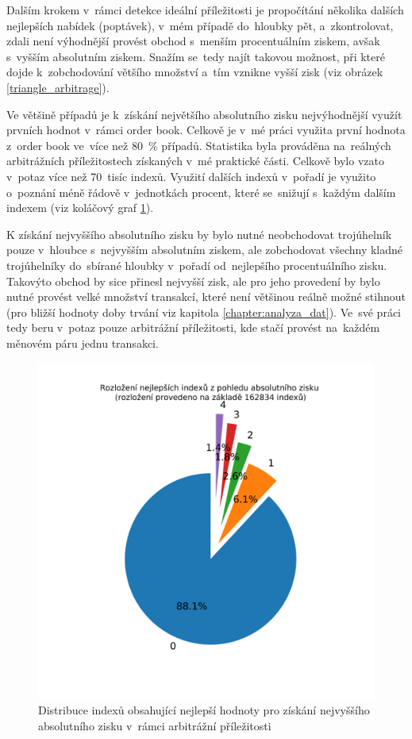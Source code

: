 \documentclass[thesis=B,czech]{FITthesis}[2019/03/21]
\begin{document}
Dalším krokem v~rámci detekce ideální příležitosti je propočítání několika dalších nejlepších nabídek (poptávek), v~mém případě do~hloubky pět, a~zkontrolovat, zdali není výhodnější provést obchod s~menším procentuálním ziskem, avšak s~vyšším absolutním ziskem. Snažím se~tedy najít takovou možnost, při které dojde k~zobchodování většího množství a~tím vznikne vyšší zisk (viz obrázek \ref{triangle_arbitrage}).

Ve většině případů je k~získání největšího absolutního zisku nejvýhodnější využít prvních hodnot v~rámci order book. Celkově je v~mé práci využita první hodnota z~order book ve~více než 80~\% případů. Statistika byla prováděna na~reálných arbitrážních příležitostech získaných v~mé praktické části. Celkově bylo vzato v~potaz více než 70~tisíc indexů. Využití dalších indexů v~pořadí je využito o~poznání méně řádově v~jednotkách procent, které se~snižují s~každým dalším indexem (viz koláčový graf \ref{index_distribution}).

K získání nejvyššího absolutního zisku by bylo nutné neobchodovat trojúhelník pouze v~hloubce s~nejvyšším absolutním ziskem, ale zobchodovat všechny kladné trojúhelníky do~sbírané hloubky v~pořadí od~nejlepšího procentuálního zisku. Takovýto obchod by sice přinesl nejvyšší zisk, ale pro jeho provedení by bylo nutné provést velké množství transakcí, které není většinou reálně možné stihnout (pro bližší hodnoty doby trvání viz kapitola \ref{chapter:analyza_dat}). Ve~své práci tedy beru v~potaz pouze arbitrážní příležitosti, kde stačí provést na~každém měnovém páru jednu transakci.

\begin{figure}\centering
	\includegraphics[width=1\textwidth]{images/index_distribution.png}
	\caption{Distribuce indexů obsahující nejlepší hodnoty pro získání nejvyššího absolutního zisku v~rámci arbitrážní příležitosti}\label{index_distribution}
\end{figure}
\end{document}
